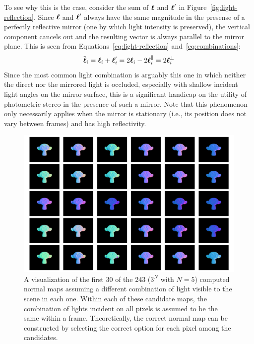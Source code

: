 To see why this is the case, consider the sum of $\boldsymbol{\ell}$ and $\boldsymbol{\ell}'$ in
Figure~\ref{fig:light-reflection}. Since $\boldsymbol{\ell}$ and $\boldsymbol{\ell}'$ always have the
same magnitude in the presense of a perfectly reflective mirror (one by which
light intensity is preserved), the vertical component cancels out and the
resulting vector is always parallel to the mirror plane. This is seen from
Equations~\ref{eq:light-reflection} and~\ref{eq:combinations}:
\begin{equation}
    \tilde{\boldsymbol{\ell}}_i = \boldsymbol{\ell}_i + \boldsymbol{\ell}_i'
                     = 2 \boldsymbol{\ell}_i - 2 \boldsymbol{\ell}_i^\parallel
                     = 2 \boldsymbol{\ell}_i^\perp
\end{equation}
Since the most common light combination is arguably this one in which neither
the direct nor the mirrored light is occluded, especially with shallow incident
light angles on the mirror surface, this is a significant handicap on the
utility of photometric stereo in the presence of such a mirror. Note that this
phenomenon only necessarily applies when the mirror is stationary (i.e., its
position does not vary between frames) and has high reflectivity.
\begin{figure}
  \includegraphics[width=\columnwidth]{images/output-candidates}
  \caption{A visualization of the first 30 of the 243 ($3^N$ with $N = 5$)
  computed normal maps assuming a different combination of light visible to the
  scene in each one. Within each of these candidate maps, the combination of
  lights incident on all pixels is assumed to be the same within a frame.
  Theoretically, the correct normal map can be constructed by selecting the
  correct option for each pixel among the
  candidates.}\label{fig:output-candidates}
\end{figure}
